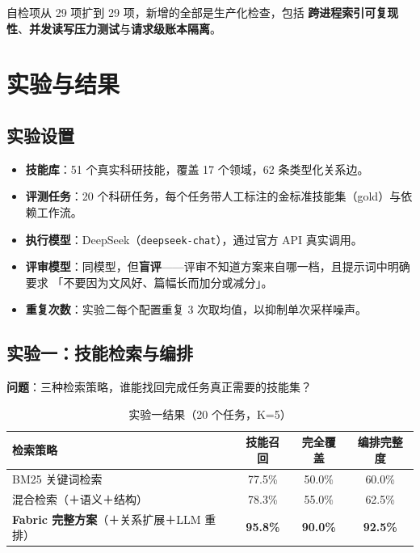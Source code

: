 \documentclass[UTF8, fontset=windows, 11pt, a4paper]{ctexart}
\begin{document}
自检项从 29 项扩到 29 项，新增的全部是生产化检查，包括
\textbf{跨进程索引可复现性}、\textbf{并发读写压力测试}与\textbf{请求级账本隔离}。

\newpage

\section{实验与结果}

\subsection{实验设置}

\begin{itemize}
\item \textbf{技能库}：51 个真实科研技能，覆盖 17 个领域，62 条类型化关系边。
\item \textbf{评测任务}：20 个科研任务，每个任务带人工标注的金标准技能集（gold）与依赖工作流。
\item \textbf{执行模型}：DeepSeek（\texttt{deepseek-chat}），通过官方 API 真实调用。
\item \textbf{评审模型}：同模型，但\textbf{盲评}——评审不知道方案来自哪一档，且提示词中明确要求
      「不要因为文风好、篇幅长而加分或减分」。
\item \textbf{重复次数}：实验二每个配置重复 3 次取均值，以抑制单次采样噪声。
\end{itemize}

\subsection{实验一：技能检索与编排}

\textbf{问题}：三种检索策略，谁能找回完成任务真正需要的技能集？

\begin{table}[h]
\centering
\begin{tabular}{@{}lccc@{}}
\toprule
\textbf{检索策略} & \textbf{技能召回} & \textbf{完全覆盖} & \textbf{编排完整度} \\
\midrule
BM25 关键词检索 & 77.5\% & 50.0\% & 60.0\% \\
混合检索（＋语义＋结构） & 78.3\% & 55.0\% & 62.5\% \\
\textbf{Fabric 完整方案}（＋关系扩展＋LLM 重排） & \textbf{95.8\%} & \textbf{90.0\%} & \textbf{92.5\%} \\
\bottomrule
\end{tabular}
\caption{实验一结果（20 个任务，K=5）}
\end{table}
\end{document}
